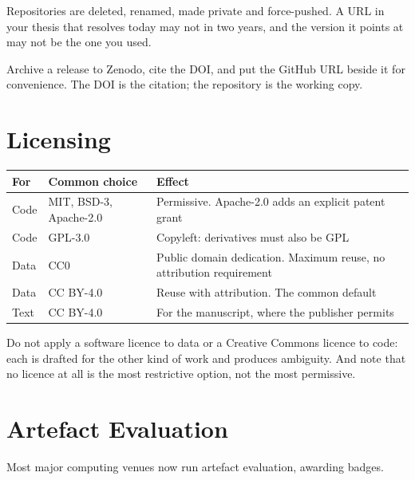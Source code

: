 \begin{alertbox}
Repositories are deleted, renamed, made private and force-pushed. A URL in your
thesis that resolves today may not in two years, and the version it points at
may not be the one you used.

\medskip
Archive a release to Zenodo, cite the DOI, and put the GitHub URL beside it for
convenience. The DOI is the citation; the repository is the working copy.
\end{alertbox}

\section{Licensing}

\begin{center}
\small
\begin{tabular}{@{}L{2.2cm}L{4.4cm}L{7.5cm}@{}}
\toprule
\textbf{For} & \textbf{Common choice} & \textbf{Effect} \\
\midrule
Code & MIT, BSD-3, Apache-2.0
     & Permissive. Apache-2.0 adds an explicit patent grant \\
Code & GPL-3.0
     & Copyleft: derivatives must also be GPL \\
Data & CC0
     & Public domain dedication. Maximum reuse, no attribution requirement \\
Data & CC BY-4.0
     & Reuse with attribution. The common default \\
Text & CC BY-4.0
     & For the manuscript, where the publisher permits \\
\bottomrule
\end{tabular}
\end{center}

Do not apply a software licence to data or a Creative Commons licence to code:
each is drafted for the other kind of work and produces ambiguity. And note
that no licence at all is the most restrictive option, not the most permissive.

\section{Artefact Evaluation}

Most major computing venues now run artefact evaluation, awarding badges.

